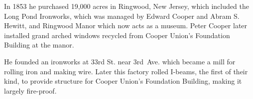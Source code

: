 \documentclass{article}
\begin{document}
\begin{minipage}[t]{0.45\linewidth}
\begin{enumList}
\item In 1853 he purchased 19,000 acres in Ringwood, New Jersey, which included
the { Long Pond Ironworks}, which was managed by
Edward Cooper and Abram S. Hewitt, and { Ringwood Manor}
which now acts as a museum. Peter Cooper later installed { grand arched windows recycled from Cooper Union's Foundation Building}
at the manor.

\item He founded an ironworks at 33rd St. near 3rd~Ave. which became a
mill for rolling iron and making wire. Later this factory { rolled I-beams}, the first of their kind, to provide structure for
{ Cooper Union's Foundation Building}, making it largely
{ fire-proof}.

\setcounter{enumTemp}{\value{enumListi}}
\end{enumList}
\end{minipage}
\vspace*{\fill}
\end{document}
